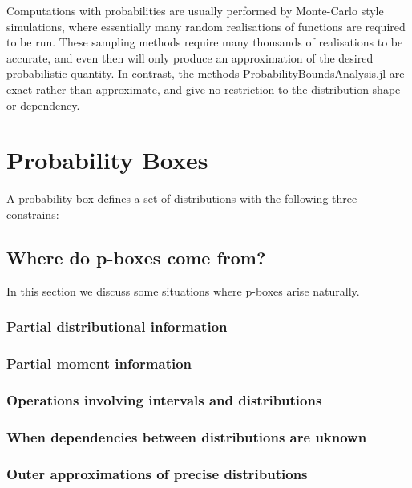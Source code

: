 \documentclass{juliacon}
\begin{document}
Computations with probabilities are usually performed by Monte-Carlo style simulations, where essentially many random realisations of functions are required to be run. These sampling methods require many thousands of realisations to be accurate, and even then will only produce an approximation of the desired probabilistic quantity. In contrast, the methods ProbabilityBoundsAnalysis.jl are exact rather than approximate, and give no restriction to the distribution shape or dependency.
\fi


\section{Probability Boxes}
\label{sec:pboxes}

A probability box defines a set of distributions with the following three constrains:


\subsection{Where do p-boxes come from?}

In this section we discuss some situations where p-boxes arise naturally.


\subsubsection{Partial distributional information} %



\subsubsection{Partial moment information} %


\subsubsection{Operations involving intervals and distributions} %

\subsubsection{When dependencies between distributions are uknown} %

\subsubsection{Outer approximations of precise distributions} %
\end{document}
